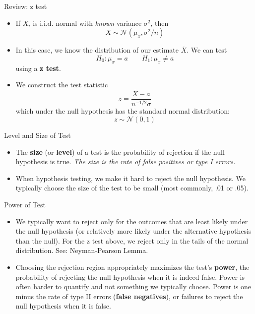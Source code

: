 \begin{frame}{Review: z test}
\begin{itemize}
	\item If $X_i$ is i.i.d. normal with \emph{known} variance $\sigma^2$, then \[
		\overline{X} \sim \mathcal{N} \left( \mu_x, \sigma^{2}/n \right)
	\]


	\item In this case, we know the distribution of our estimate $\overline{X}$. We can test\[
H_{0}:\mu_{x}=a \qquad H_{1}:\mu_{x}\ne a
\]
using a {\bf z test}.

	\item We construct the test statistic\[
		z = \frac{ \overline{X} - a}{n^{-1/2}\sigma}
	\]
	which under the null hypothesis has the standard normal distribution:\[
	 z \sim \mathcal{N} \left( 0,1\right)
\]
\end{itemize}
\end{frame}



\begin{frame}{Level and Size of Test}
\begin{itemize}
	\item The {\bf size} (or {\bf level}) of a test is the probability of rejection if the null hypothesis is true. 
	\emph{The size is the rate of false positives or type I errors.}

	\item When hypothesis testing, we make it hard to reject the null hypothesis. We typically choose the 
	size of the test to be small (most commonly, .01 or .05).

\end{itemize}
\end{frame}




\begin{frame}{Power of Test}
\begin{itemize}

	\item We typically want to reject only for the outcomes that are least likely under the null
	hypothesis (or relatively more likely under the alternative hypothesis than the null). For
	the z test above, we reject only in the tails of the normal distribution. See: Neyman-Pearson Lemma.
	
	\medskip
	\item Choosing the rejection region appropriately maximizes the test's {\bf power}, the 
	probability of rejecting the null hypothesis when it is indeed false. Power is often harder
	to quantify and not something we typically choose. Power is one minus the rate of
	type II errors (\textbf{false negatives}), or failures to reject the null hypothesis when it is false. 
\end{itemize}
\end{frame}



